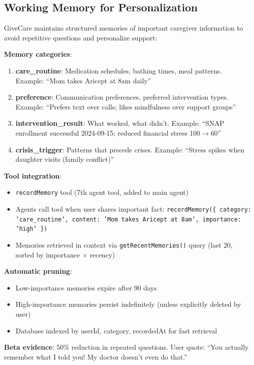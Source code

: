 \documentclass{article}%
\begin{document}
\subsection{Working Memory for Personalization}%
\label{subsec:WorkingMemoryforPersonalization}%
GiveCare maintains structured memories of important caregiver information to avoid repetitive questions and personalize support:

\textbf{Memory categories}:
\begin{enumerate}
    \item \textbf{care\_routine}: Medication schedules, bathing times, meal patterns. Example: ``Mom takes Aricept at 8am daily''
    \item \textbf{preference}: Communication preferences, preferred intervention types. Example: ``Prefers text over calls; likes mindfulness over support groups''
    \item \textbf{intervention\_result}: What worked, what didn't. Example: ``SNAP enrollment successful 2024-09-15; reduced financial stress 100$\rightarrow$60''
    \item \textbf{crisis\_trigger}: Patterns that precede crises. Example: ``Stress spikes when daughter visits (family conflict)''
\end{enumerate}

\textbf{Tool integration}:
\begin{itemize}
    \item \texttt{recordMemory} tool (7th agent tool, added to main agent)
    \item Agents call tool when user shares important fact: \texttt{recordMemory(\{ category: 'care\_routine', content: 'Mom takes Aricept at 8am', importance: 'high' \})}
    \item Memories retrieved in context via \texttt{getRecentMemories()} query (last 20, sorted by importance $\times$ recency)
\end{itemize}

\textbf{Automatic pruning}:
\begin{itemize}
    \item Low-importance memories expire after 90 days
    \item High-importance memories persist indefinitely (unless explicitly deleted by user)
    \item Database indexed by userId, category, recordedAt for fast retrieval
\end{itemize}

\textbf{Beta evidence}: 50\% reduction in repeated questions. User quote: ``You actually remember what I told you! My doctor doesn't even do that.''
\end{document}
